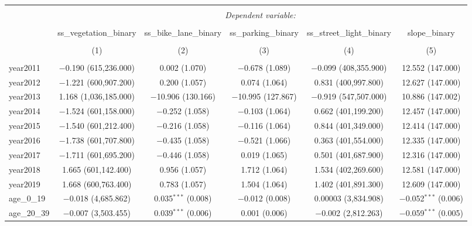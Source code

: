 
\begin{table}[!htbp] \centering 
  \caption{} 
  \label{} 
\small 
\begin{tabular}{@{\extracolsep{1pt}}lccccc} 
\\[-1.8ex]\hline 
\hline \\[-1.8ex] 
 & \multicolumn{5}{c}{\textit{Dependent variable:}} \\ 
\cline{2-6} 
\\[-1.8ex] & ss\_vegetation\_binary & ss\_bike\_lane\_binary & ss\_parking\_binary & ss\_street\_light\_binary & slope\_binary \\ 
\\[-1.8ex] & (1) & (2) & (3) & (4) & (5)\\ 
\hline \\[-1.8ex] 
 year2011 & $-$0.190 (615,236.000) & 0.002 (1.070) & $-$0.678 (1.089) & $-$0.099 (408,355.900) & 12.552 (147.000) \\ 
  year2012 & $-$1.221 (600,907.200) & 0.200 (1.057) & 0.074 (1.064) & 0.831 (400,997.800) & 12.627 (147.000) \\ 
  year2013 & 1.168 (1,036,185.000) & $-$10.906 (130.166) & $-$10.995 (127.867) & $-$0.919 (547,507.000) & 10.886 (147.002) \\ 
  year2014 & $-$1.524 (601,158.000) & $-$0.252 (1.058) & $-$0.103 (1.064) & 0.662 (401,199.200) & 12.457 (147.000) \\ 
  year2015 & $-$1.540 (601,212.400) & $-$0.216 (1.058) & $-$0.116 (1.064) & 0.844 (401,349.000) & 12.414 (147.000) \\ 
  year2016 & $-$1.738 (601,707.800) & $-$0.435 (1.058) & $-$0.521 (1.066) & 0.363 (401,554.000) & 12.335 (147.000) \\ 
  year2017 & $-$1.711 (601,695.200) & $-$0.446 (1.058) & 0.019 (1.065) & 0.501 (401,687.900) & 12.316 (147.000) \\ 
  year2018 & 1.665 (601,142.400) & 0.956 (1.057) & 1.712 (1.064) & 1.534 (402,269.600) & 12.581 (147.000) \\ 
  year2019 & 1.668 (600,763.400) & 0.783 (1.057) & 1.504 (1.064) & 1.402 (401,891.300) & 12.609 (147.000) \\ 
  age\_0\_19 & $-$0.018 (4,685.862) & 0.035$^{***}$ (0.008) & $-$0.012 (0.008) & 0.00003 (3,834.908) & $-$0.052$^{***}$ (0.006) \\ 
  age\_20\_39 & $-$0.007 (3,503.455) & 0.039$^{***}$ (0.006) & 0.001 (0.006) & $-$0.002 (2,812.263) & $-$0.059$^{***}$ (0.005) \\ 

\end{tabular}
\end{table}
